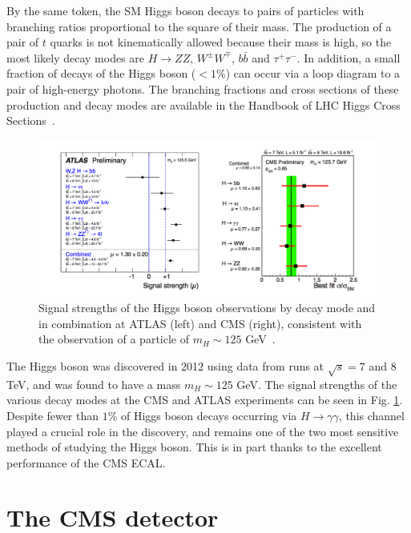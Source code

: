 \documentclass[10pt]{article}
\begin{document}
By the same token, the SM Higgs boson decays to pairs of particles with branching ratios proportional to the square of their mass. The production of a pair of $t$ quarks is not kinematically allowed because their mass is high, so the most likely decay modes are $H \rightarrow ZZ \text{, } W^{\pm}W^{\mp}$, $ b\bar{b}$ and $ \tau^+ \tau^-$. In addition, a small fraction of decays of the Higgs boson ($<1\%$) can occur via a loop diagram to a pair of high-energy photons. The branching fractions and cross sections of these production and decay modes are available in the Handbook of LHC Higgs Cross Sections~\cite{H_XS1,H_XS2}.


\begin{figure}[h!]
\centering
\includegraphics[width=\textwidth]{"SignalStrength"}
\caption{Signal strengths of the Higgs boson observations by decay mode and in combination at ATLAS (left) and CMS (right), consistent with the observation of a particle of $m_H \sim 125$ GeV~\cite{H_XS3}.}
\label{sig_strength}
\end{figure}

The Higgs boson was discovered in 2012 using data from runs at $\sqrt{s}=7$ and $8$ TeV, and was found to have a mass $m_H \sim 125$ GeV. The signal strengths of the various decay modes at the CMS and ATLAS experiments can be seen in Fig. \ref{sig_strength}. Despite fewer than $1\%$ of Higgs boson decays occurring via $H \rightarrow \gamma \gamma$, this channel played a crucial role in the discovery, and remains one of the two most sensitive methods of studying the Higgs boson. This is in part thanks to the excellent performance of the CMS ECAL.



\section{The CMS detector}
\end{document}
